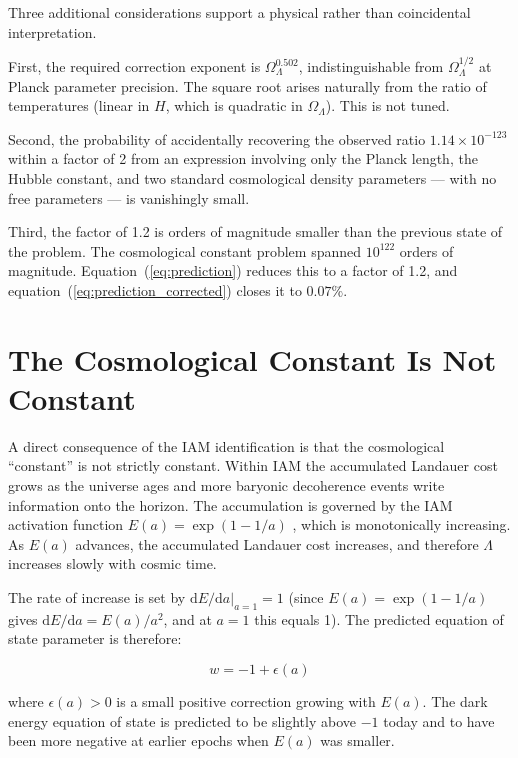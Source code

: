 \documentclass[12pt,a4paper]{article}
\begin{document}
Three additional considerations support a physical rather than coincidental
interpretation.

First, the required correction exponent is $\Omega_\Lambda^{0.502}$,
indistinguishable from $\Omega_\Lambda^{1/2}$ at Planck parameter
precision. The square root arises naturally from the ratio of temperatures
(linear in $H$, which is quadratic in $\Omega_\Lambda$). This is not
tuned.

Second, the probability of accidentally recovering the observed ratio
$1.14 \times 10^{-123}$ within a factor of 2 from an expression
involving only the Planck length, the Hubble constant, and two standard
cosmological density parameters — with no free parameters — is
vanishingly small.

Third, the factor of 1.2 is orders of magnitude smaller than the
previous state of the problem. The cosmological constant problem spanned
$10^{122}$ orders of magnitude. Equation~(\ref{eq:prediction}) reduces
this to a factor of 1.2, and equation~(\ref{eq:prediction_corrected})
closes it to $0.07\%$.

\section{The Cosmological Constant Is Not Constant}
\label{sec:not_constant}

A direct consequence of the IAM identification is that the cosmological
``constant'' is not strictly constant. Within IAM the accumulated
Landauer cost grows as the universe ages and more baryonic decoherence
events write information onto the horizon. The accumulation is governed
by the IAM activation function $E(a) = \exp(1-1/a)$
\citep{mahaffey2026}, which is monotonically increasing. As $E(a)$
advances, the accumulated Landauer cost increases, and therefore
$\Lambda$ increases slowly with cosmic time.

The rate of increase is set by $\mathrm{d}E/\mathrm{d}a|_{a=1} = 1$
(since $E(a) = \exp(1-1/a)$ gives $\mathrm{d}E/\mathrm{d}a = E(a)/a^2$,
and at $a=1$ this equals 1). The predicted equation of state parameter
is therefore:

\begin{equation}
w = -1 + \epsilon(a)
\label{eq:w}
\end{equation}

where $\epsilon(a) > 0$ is a small positive correction growing with
$E(a)$. The dark energy equation of state is predicted to be slightly
above $-1$ today and to have been more negative at earlier epochs when
$E(a)$ was smaller.
\end{document}

